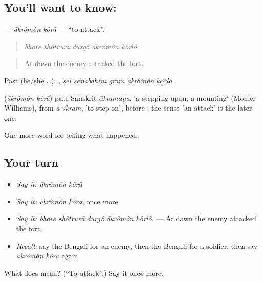 \subsection*{You'll want to know:  }
\textbf{ } — \emph{ākrômôn kôrā} — \textquotedblleft{}to attack\textquotedblright{}.

\begin{quote}
    
\end{quote}

\begin{quote}
\emph{bhore shôtrurā durgô ākrômôn kôrlô.}
\end{quote}

\begin{quote}
At dawn the enemy attacked the fort.
\end{quote}

Past (he/she …):     , \emph{sei senābāhinī grām ākrômôn kôrlô}.

\begin{cousinweb}
\textbf{ } (\emph{ākrômôn kôrā}) puts Sanskrit \emph{ākramaṇa}, 'a stepping upon, a mounting' (Monier-Williams), from \emph{ā-√kram}, 'to step on', before ; the sense 'an attack' is the later one.
\end{cousinweb}

\begin{grammarlens}[title={What you've built}]
One more word for telling what happened.
\end{grammarlens}

\subsection*{Your turn}
\begin{itemize}
\raggedright
  \item \emph{Say it:} \emph{ākrômôn kôrā}
  \item \emph{Say it:} \emph{ākrômôn kôrā}, once more
  \item \emph{Say it:} \emph{bhore shôtrurā durgô ākrômôn kôrlô.} — At dawn the enemy attacked the fort.
  \item \emph{Recall:} say the Bengali for an enemy, then the Bengali for a soldier, then say \emph{ākrômôn kôrā} again
\end{itemize}

\begin{tcolorbox}[breakable,colback=teal!4,colframe=teal!35!black,title={Before you move on}]
What does   mean? (\textquotedblleft{}To attack\textquotedblright{}.) Say it once more.
\end{tcolorbox}
